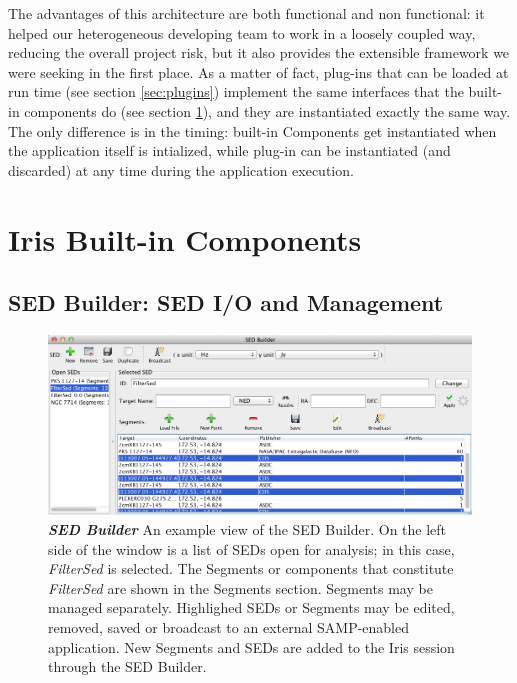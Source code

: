 \documentclass[5p]{elsarticle}
\begin{document}
The advantages of this architecture are both functional and non functional: it helped our heterogeneous developing team to work in a loosely coupled way, reducing the overall project risk, but it also provides the extensible framework we were seeking in the first place. As a matter of fact, plug-ins that can be loaded at run time (see section \ref{sec:plugins}) implement the same interfaces that the built-in components do (see section \ref{sec:components}), and they are instantiated exactly the same way. The only difference is in the timing: built-in Components get instantiated when the application itself is intialized, while plug-in can be instantiated (and discarded) at any time during the application execution.

\section{Iris Built-in Components}
\label{sec:components}

\subsection{SED Builder: SED I/O and Management}

\begin{figure}
\begin{center}
\includegraphics[width=\columnwidth]{figures/sed_builder.png}
\caption{\textit{\textbf{\label{fig:sed_builder} SED Builder}} An example view of the SED Builder. On the left side of the window is a list of SEDs open for analysis; in this case, \textit{FilterSed} is selected. The Segments or components that constitute \textit{FilterSed} are shown in the Segments section. Segments may be managed separately. Highlighed SEDs or Segments may be edited, removed, saved or broadcast to an external SAMP-enabled application. New Segments and SEDs are added to the Iris session through the SED Builder. }
\end{center}
\end{figure}
\end{document}
